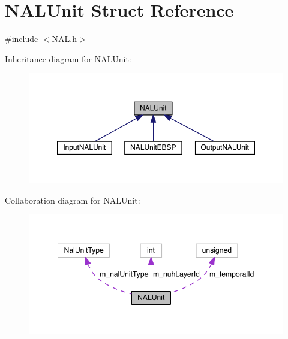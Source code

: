 \hypertarget{struct_n_a_l_unit}{}\section{N\+A\+L\+Unit Struct Reference}
\label{struct_n_a_l_unit}


{\ttfamily \#include $<$N\+A\+L.\+h$>$}



Inheritance diagram for N\+A\+L\+Unit\+:
\nopagebreak
\begin{figure}[H]
\begin{center}
\leavevmode
\includegraphics[width=350pt]{d5/dc1/struct_n_a_l_unit__inherit__graph}
\end{center}
\end{figure}


Collaboration diagram for N\+A\+L\+Unit\+:
\nopagebreak
\begin{figure}[H]
\begin{center}
\leavevmode
\includegraphics[width=348pt]{de/d23/struct_n_a_l_unit__coll__graph}
\end{center}
\end{figure}
